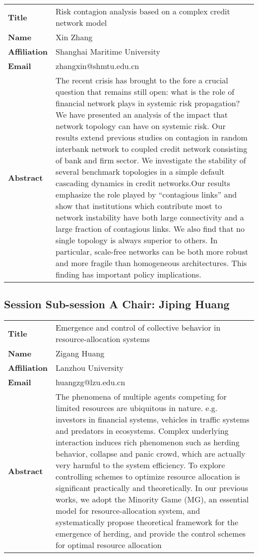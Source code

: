 \documentclass[oneside,A4paper,12pt]{article}
\begin{document}
\newpage
\begin{longtable}{p{2cm}p{14cm}}
\toprule
\textbf{Title} & Risk contagion analysis based on a complex credit network model\\
\textbf{Name} & Xin Zhang\\
\textbf{Affiliation} & Shanghai Maritime University\\
\textbf{Email} & zhangxin@shmtu.edu.cn\\
\textbf{Abstract} & The recent crisis has brought to the fore a crucial question that remains still open: what is the role of financial network plays in systemic risk propagation? We have presented an analysis of the impact that network topology can have on systemic risk. Our results extend previous studies on contagion in random interbank network to coupled credit network consisting of bank and firm sector. We investigate the stability of several benchmark topologies in a simple default cascading dynamics in credit networks.Our results emphasize the role played by “contagious links” and show that institutions which contribute most to network instability have both large connectivity and a large fraction of contagious links. We also find that no single topology is always superior to others. In particular, scale-free networks can be both more robust and more fragile than homogeneous architectures. This finding has important policy implications.\\
\bottomrule
\end{longtable}



\newpage
\subsection*{Session \uppercase\expandafter{} \hspace{10mm} Sub-session A \hspace{10mm} Chair: Jiping Huang}
\label{sec:org10ab4ba}

\begin{longtable}{p{2cm}p{14cm}}
\toprule
\textbf{Title} & Emergence and control of collective behavior in resource-allocation systems\\
\textbf{Name} & Zigang Huang\\
\textbf{Affiliation} & Lanzhou University\\
\textbf{Email} & huangzg@lzu.edu.cn\\
\textbf{Abstract} & The phenomena of multiple agents competing for limited resources are ubiquitous in nature. e.g. investors in financial systems, vehicles in traffic systems and predators in ecosystems. Complex underlying interaction induces rich phenomenon such as herding behavior, collapse and panic crowd, which are actually very harmful to the system efficiency. To explore controlling schemes to optimize resource allocation is significant practically and theoretically. In our previous works, we adopt the Minority Game (MG), an essential model for resource-allocation system, and systematically propose theoretical framework for the emergence of herding, and provide the control schemes for optimal resource allocation\\
\bottomrule
\end{longtable}
\end{document}
